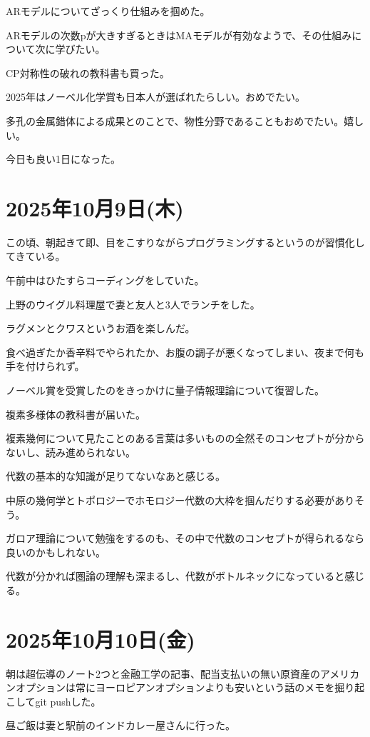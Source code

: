 \documentclass[uplatex]{jsarticle}
\begin{document}
ARモデルについてざっくり仕組みを掴めた。

ARモデルの次数pが大きすぎるときはMAモデルが有効なようで、その仕組みについて次に学びたい。

CP対称性の破れの教科書も買った。

2025年はノーベル化学賞も日本人が選ばれたらしい。おめでたい。

多孔の金属錯体による成果とのことで、物性分野であることもおめでたい。嬉しい。

今日も良い1日になった。

\section{2025年10月9日(木)}

この頃、朝起きて即、目をこすりながらプログラミングするというのが習慣化してきている。

午前中はひたすらコーディングをしていた。

上野のウイグル料理屋で妻と友人と3人でランチをした。

ラグメンとクワスというお酒を楽しんだ。

食べ過ぎたか香辛料でやられたか、お腹の調子が悪くなってしまい、夜まで何も手を付けられず。

ノーベル賞を受賞したのをきっかけに量子情報理論について復習した。

複素多様体の教科書が届いた。

複素幾何について見たことのある言葉は多いものの全然そのコンセプトが分からないし、読み進められない。

代数の基本的な知識が足りてないなあと感じる。

中原の幾何学とトポロジーでホモロジー代数の大枠を掴んだりする必要がありそう。

ガロア理論について勉強をするのも、その中で代数のコンセプトが得られるなら良いのかもしれない。

代数が分かれば圏論の理解も深まるし、代数がボトルネックになっていると感じる。

\section{2025年10月10日(金)}

朝は超伝導のノート2つと金融工学の記事、配当支払いの無い原資産のアメリカンオプションは常にヨーロピアンオプションよりも安いという話のメモを掘り起こしてgit pushした。

昼ご飯は妻と駅前のインドカレー屋さんに行った。
\end{document}
